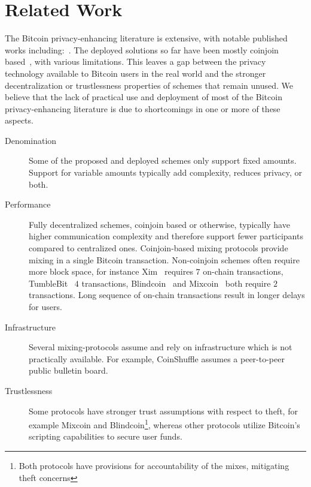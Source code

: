 \documentclass[a4paper]{article}
\begin{document}
\section{Related Work}\label{sec:relatedwork}

The Bitcoin privacy-enhancing literature is extensive, with notable published works including:~\cite{bonneau2014mixcoin,bissias2014sybil,ruffing2014coinshuffle,valenta2015blindcoin,ziegeldorf2015coinparty,ruffing2017p2p,maurer2017anonymous,heilman2017tumblebit}. The deployed solutions so far have been mostly coinjoin based~\cite{maxwell2013coinjoin}, with various limitations. This leaves a gap between the privacy technology available to Bitcoin users in the real world and the stronger decentralization or trustlessness properties of schemes that remain unused. We believe that the lack of practical use and deployment of most of the Bitcoin privacy-enhancing literature is due to shortcomings in one or more of these aspects.

\begin{description}
 \item[Denomination] Some of the proposed and deployed schemes only support fixed amounts. Support for variable amounts typically add complexity, reduces privacy, or both.
 \item[Performance] Fully decentralized schemes, coinjoin based or otherwise, typically have higher communication complexity and therefore support fewer participants compared to centralized ones. Coinjoin-based mixing protocols provide mixing in a single Bitcoin transaction. Non-coinjoin schemes often require more block space, for instance Xim~\cite{bissias2014sybil} requires $7$ on-chain transactions, TumbleBit~\cite{heilman2017tumblebit} $4$ transactions, Blindcoin~\cite{valenta2015blindcoin} and Mixcoin~\cite{bonneau2014mixcoin} both require $2$ transactions. Long sequence of on-chain transactions result in longer delays for users.
 \item[Infrastructure] Several mixing-protocols assume and rely on infrastructure which is not practically available. For example, CoinShuffle assumes a peer-to-peer public bulletin board.
 \item[Trustlessness] Some protocols have stronger trust assumptions with respect to theft, for example Mixcoin and Blindcoin\footnote{Both protocols have provisions for accountability of the mixes, mitigating theft concerns}, whereas other protocols utilize Bitcoin's scripting capabilities to secure user funds.
\end{description}
\end{document}
